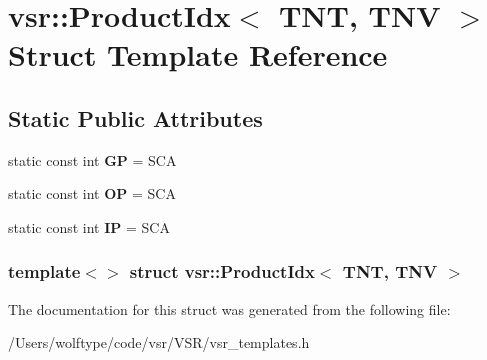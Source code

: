 \hypertarget{structvsr_1_1_product_idx_3_01_t_n_t_00_01_t_n_v_01_4}{\section{vsr\-:\-:Product\-Idx$<$ T\-N\-T, T\-N\-V $>$ Struct Template Reference}
\label{structvsr_1_1_product_idx_3_01_t_n_t_00_01_t_n_v_01_4}
}
\subsection*{Static Public Attributes}
\begin{DoxyCompactItemize}
\item 
\hypertarget{structvsr_1_1_product_idx_3_01_t_n_t_00_01_t_n_v_01_4_a63f94162a01b1ea7a9c5850f75a6edea}{static const int {\bfseries G\-P} = S\-C\-A}\label{structvsr_1_1_product_idx_3_01_t_n_t_00_01_t_n_v_01_4_a63f94162a01b1ea7a9c5850f75a6edea}

\item 
\hypertarget{structvsr_1_1_product_idx_3_01_t_n_t_00_01_t_n_v_01_4_a75f4babab069ccd63d8c2a4e4035de7b}{static const int {\bfseries O\-P} = S\-C\-A}\label{structvsr_1_1_product_idx_3_01_t_n_t_00_01_t_n_v_01_4_a75f4babab069ccd63d8c2a4e4035de7b}

\item 
\hypertarget{structvsr_1_1_product_idx_3_01_t_n_t_00_01_t_n_v_01_4_a9ffe871287d8a2fe3585190eda1c2dad}{static const int {\bfseries I\-P} = S\-C\-A}\label{structvsr_1_1_product_idx_3_01_t_n_t_00_01_t_n_v_01_4_a9ffe871287d8a2fe3585190eda1c2dad}

\end{DoxyCompactItemize}
\subsubsection*{template$<$$>$ struct vsr\-::\-Product\-Idx$<$ T\-N\-T, T\-N\-V $>$}



The documentation for this struct was generated from the following file\-:\begin{DoxyCompactItemize}
\item 
/\-Users/wolftype/code/vsr/\-V\-S\-R/vsr\-\_\-templates.\-h\end{DoxyCompactItemize}
